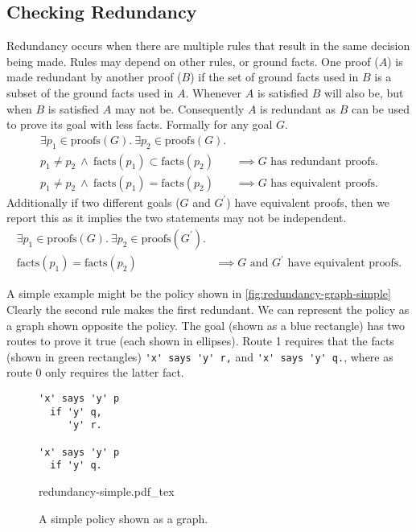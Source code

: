 \documentclass[a4paper]{scrartcl}
\begin{document}
\subsection{Checking Redundancy}

Redundancy occurs when there are multiple rules that result in the same decision being
made.  Rules may depend on other rules, or ground facts.  One proof ($A$) is made
redundant by another proof ($B$) if the set of ground facts used in $B$ is a
subset of the ground facts used in $A$. Whenever $A$ is satisfied $B$ will also
be, but when $B$ is satisfied $A$ may not be.  Consequently $A$ is redundant as
$B$ can be used to prove its goal with less facts.
Formally for any goal $G$.
\begin{align*}
  \exists p_1 \in \text{proofs}(G).~\exists p_2 \in \text{proofs}(G).&\\
  p_1 \not= p_2~\wedge~\text{facts}(p_1) \subset \text{facts}(p_2)&\implies G\text{ has redundant proofs.} \\
  p_1 \not= p_2~\wedge~\text{facts}(p_1) = \text{facts}(p_2)&\implies G\text{ has equivalent proofs.}
\end{align*}
Additionally if two different goals ($G$ and $G^\prime$) have equivalent proofs, then we report this
as it implies the two statements may not be independent.
\begin{align*}
  \exists p_1 \in \text{proofs}(G).~\exists p_2 \in \text{proofs}(G^\prime).&\\
  \text{facts}(p_1) = \text{facts}(p_2)&\implies \text{$G$ and $G^\prime$ have equivalent proofs.}
\end{align*}


A simple example might be the policy shown in \autoref{fig:redundancy-graph-simple}
Clearly the second rule makes the first redundant.  We can represent the policy
as a graph shown opposite the policy.  The goal (shown as a blue rectangle) has two routes
to prove it true (each shown in ellipses).  Route 1 requires that the facts
(shown in green rectangles) \lstinline!'x' says 'y' r,! and
\lstinline!'x' says 'y' q.!, where as route 0 only requires the
latter fact.

\begin{figure}[!H]
  \centering
  \begin{minipage}{0.4\linewidth}
  \begin{lstlisting}
'x' says 'y' p
  if 'y' q,
     'y' r.

'x' says 'y' p
  if 'y' q.
  \end{lstlisting}
  \end{minipage}
  \begin{minipage}{0.59\linewidth}
    \scriptsize{}
    \def\svgwidth{\columnwidth}
    {redundancy-simple.pdf_tex}
  \end{minipage}
  \caption{A simple policy shown as a graph.}
  \label{fig:redundancy-graph-simple}
\end{figure}
\end{document}
